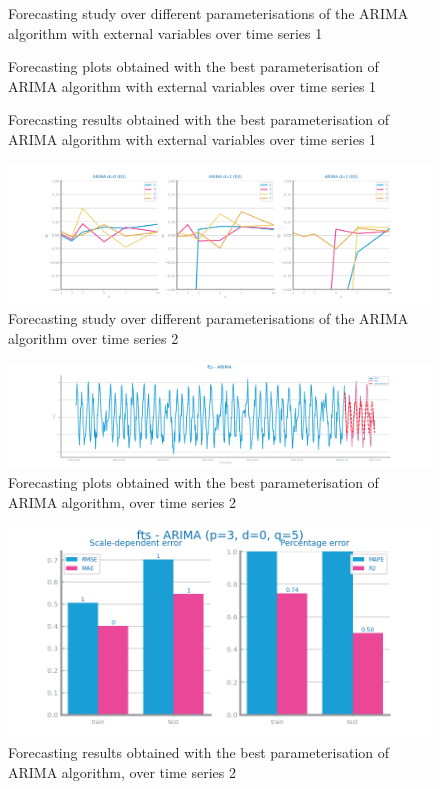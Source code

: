 \documentclass[10pt]{extarticle}
\begin{document}
\begin{figure}[H]
\caption{Forecasting study over different parameterisations of the ARIMA algorithm with external variables over time series 1}
\end{figure}

\begin{figure}[H]
\caption{Forecasting plots obtained with the best parameterisation of ARIMA algorithm with external variables over time series 1}
\end{figure}

\begin{figure}[H]
\caption{Forecasting results obtained with the best parameterisation of ARIMA algorithm with external variables over time series 1}
\end{figure}

\begin{figure}[H]
\centering\includegraphics[scale=0.4]{images/dataset2/time_series/fts_arima_R2_study.png}
\caption{Forecasting study over different parameterisations of the ARIMA algorithm over time series 2}
\end{figure}

\begin{figure}[H]
\centering\includegraphics[scale=0.4]{images/dataset2/time_series/fts_arima_R2_forecast.png}
\caption{Forecasting plots obtained with the best parameterisation of ARIMA algorithm, over time series 2}
\end{figure}

\begin{figure}[H]
\centering\includegraphics[scale=0.5]{images/dataset2/time_series/fts_arima_R2_eval.png}
\caption{Forecasting results obtained with the best parameterisation of ARIMA algorithm, over time series 2}
\end{figure}
\end{document}
